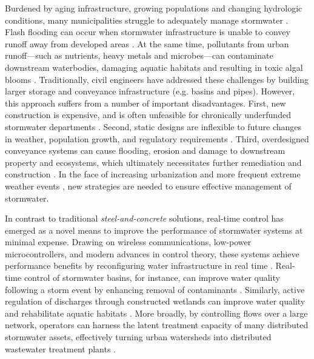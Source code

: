 
Burdened by aging infrastructure, growing populations and changing hydrologic conditions, many municipalities struggle to adequately manage stormwater \cite{Kerkez_2016}.
Flash flooding can occur when stormwater infrastructure is unable to convey runoff away from developed areas \cite{Wright_2017}.
At the same time, pollutants from urban runoff---such as nutrients, heavy metals and microbes---can contaminate downstream waterbodies, damaging aquatic habitats and resulting in toxic algal blooms \cite{Kerkez_2016}. Traditionally, civil engineers have addressed these challenges by building larger storage and conveyance infrastructure (e.g. basins and pipes). However, this approach suffers from a number of important disadvantages. First, new construction is expensive, and is often unfeasible for chronically underfunded stormwater departments \cite{Montestruque_2015}. Second, static designs are inflexible to future changes in weather, population growth, and regulatory requirements \cite{Wright_2017}. Third, overdesigned conveyance systems can cause flooding, erosion and damage to downstream property and ecosystems, which ultimately necessitates further remediation and construction \cite{Kerkez_2016}. In the face of increasing urbanization and more frequent extreme weather events \cite{Bronstert_2002, stocker_2014}, new strategies are needed to ensure effective management of stormwater.

In contrast to traditional \textit{steel-and-concrete} solutions, real-time control has emerged as a novel means to improve the performance of stormwater systems at minimal expense. Drawing on wireless communications, low-power microcontrollers, and modern advances in control theory, these systems achieve performance benefits by reconfiguring water infrastructure in real time \cite{Bartos_2018, Kerkez_2016}. Real-time control of stormwater basins, for instance, can improve water quality following a storm event by enhancing removal of contaminants \cite{Kerkez_2016}. Similarly, active regulation of discharges through constructed wetlands can improve water quality and rehabilitate aquatic habitats \cite{Mullapudi_2017, Bartos_2018}. More broadly, by controlling flows over a large network, operators can harness the latent treatment capacity of many distributed stormwater assets, effectively turning urban watersheds into distributed wastewater treatment plants \cite{Bartos_2018, Kerkez_2016}.

